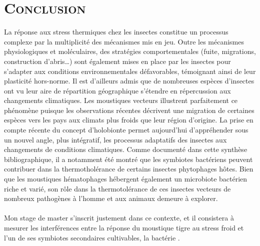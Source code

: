 
\section*{\textsc{Conclusion}}

La réponse aux stress thermiques chez les insectes constitue un processus complexe par la multiplicité des mécanismes mis en jeu.
Outre les mécanismes physiologiques et moléculaires, des stratégies comportementales (fuite, migrations, construction d'abris\ldots) sont également mises en place par les insectes pour s'adapter aux conditions environnementales défavorables, témoignant ainsi de leur plasticité hors-norme. 
Il est d'ailleurs admis que de nombreuses espèces d'insectes ont vu leur aire de répartition géographique s'étendre en répercussion aux changements climatiques.
Les moustiques vecteurs illustrent parfaitement ce phénomène puisque les observations récentes décrivent une migration de certaines espèces vers les pays aux climats plus froids que leur région d'origine.
La prise en compte récente du concept d'holobionte permet aujourd'hui d'appréhender sous un nouvel angle, plus intégratif, les processus adaptatifs des insectes aux changements de conditions climatiques.
Comme documenté dans cette synthèse bibliographique, il a notamment été montré que les symbiotes bactériens peuvent contribuer dans la thermotholérance de certains insectes phytophages hôtes.
Bien que les moustiques hématophages hébergent également un microbiote bactérien riche et varié, son rôle dans la thermotolérance de ces insectes vecteurs de nombreux pathogènes à l'homme et aux animaux demeure à explorer.

\paragraph{}
Mon stage de master s'inscrit justement dans ce contexte, et il consistera à mesurer les interférences entre la réponse du moustique tigre  au stress froid et l'un de ses symbiotes secondaires cultivables, la bactérie . 

